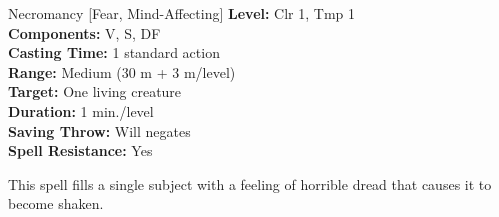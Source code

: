{Necromancy [Fear, Mind-Affecting]}
{
	\textbf{Level:}
	Clr 1, Tmp 1\\
	\textbf{Components:}
	V, S, DF\\
	\textbf{Casting Time:}
	1 standard action\\
	\textbf{Range:}
	Medium (30 m + 3 m/level)\\
	\textbf{Target:}
	One living creature\\
	\textbf{Duration:}
	1 min./level\\
	\textbf{Saving Throw:}
	Will negates\\
	\textbf{Spell Resistance:}
	Yes\\
}
{
	This spell fills a single subject with a feeling of horrible dread that causes it to become shaken.

}
